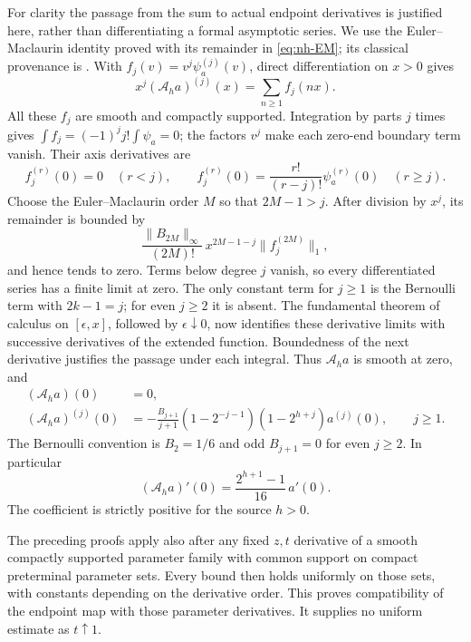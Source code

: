 For clarity the passage from the sum to actual endpoint derivatives
is justified here, rather than differentiating a formal asymptotic
series. We use the Euler--Maclaurin identity proved with its remainder
in \eqref{eq:nh-EM}; its classical provenance is
\cite[\S2.10(i), (2.10.1)]{olverDLMF2}. With
\(f_j(v)=v^j\psi_a^{(j)}(v)\), direct differentiation on \(x>0\)
gives
\[
 x^j(\mathcal A_ha)^{(j)}(x)=\sum_{n\ge1}f_j(nx).
\]
All these \(f_j\) are smooth and compactly supported. Integration by
parts \(j\) times gives
\(\int f_j=(-1)^j j!\int\psi_a=0\); the factors \(v^j\) make
each zero-end boundary term vanish. Their axis derivatives are
\[
 f_j^{(r)}(0)=0\quad(r<j),\qquad
 f_j^{(r)}(0)=\frac{r!}{(r-j)!}\psi_a^{(r)}(0)\quad(r\ge j).
\]
Choose the Euler--Maclaurin order \(M\) so that \(2M-1>j\).
After division by \(x^j\), its remainder is bounded by
\[
 \frac{\|B_{2M}\|_\infty}{(2M)!}\,
 x^{2M-1-j}\|f_j^{(2M)}\|_1,
\]
and hence tends to zero. Terms below degree \(j\) vanish, so every
differentiated series has a finite limit at zero. The only constant
term for \(j\ge1\) is the Bernoulli term with \(2k-1=j\); for even
\(j\ge2\) it is absent. The fundamental theorem of calculus on
\([\epsilon,x]\), followed by \(\epsilon\downarrow0\), now identifies
these derivative limits with successive derivatives of the extended
function. Boundedness of the next derivative justifies the passage
under each integral. Thus \(\mathcal A_ha\) is smooth at zero, and
\begin{equation}\label{naj:all-jets}
 \begin{split}
 (\mathcal A_ha)(0)&=0,\\
 (\mathcal A_ha)^{(j)}(0)&=
 -\frac{B_{j+1}}{j+1}
 (1-2^{-j-1})(1-2^{h+j})a^{(j)}(0),\qquad j\ge1.
 \end{split}
\end{equation}
The Bernoulli convention is \(B_2=1/6\) and odd \(B_{j+1}=0\)
for even \(j\ge2\).
In particular
\begin{equation}\label{naj:first-map}
 (\mathcal A_ha)'(0)=
       \frac{2^{h+1}-1}{16}\,a'(0).
\end{equation}
The coefficient is strictly positive for the source \(h>0\).

The preceding proofs apply also after any fixed \(z,t\) derivative of
a smooth compactly supported parameter family with common support on
compact preterminal parameter sets. Every bound then holds uniformly
on those sets, with constants depending on the derivative order.
This proves compatibility of the endpoint map with those parameter
derivatives. It supplies no uniform estimate as \(t\uparrow1\).

